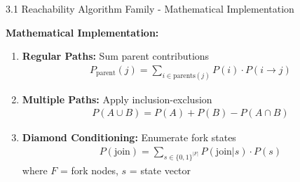 \documentclass[aspectratio=169]{beamer}
\begin{document}
\begin{frame}{\textcolor{juliapurple}{3.1  Reachability Algorithm Family  - Mathematical Implementation}}

\textbf{\textcolor{juliagreen}{Mathematical Implementation:}}
\begin{enumerate}
    \item \textbf{Regular Paths:} Sum parent contributions
    \begin{align}
    P_{\text{parent}}(j) = \sum_{i \in \text{parents}(j)} P(i) \cdot P(i \to j)
    \end{align}
    
    \item \textbf{Multiple Paths:} Apply inclusion-exclusion  
    \begin{align}
    P(A \cup B) = P(A) + P(B) - P(A \cap B)
    \end{align}
    
    \item \textbf{Diamond Conditioning:} Enumerate fork states
    \begin{align}
    P(\text{join}) = \sum_{s \in \{0,1\}^{|F|}} P(\text{join}|s) \cdot P(s)
    \end{align}
    where $F$ = fork nodes, $s$ = state vector
    
\end{enumerate}



\end{frame}
\end{document}
